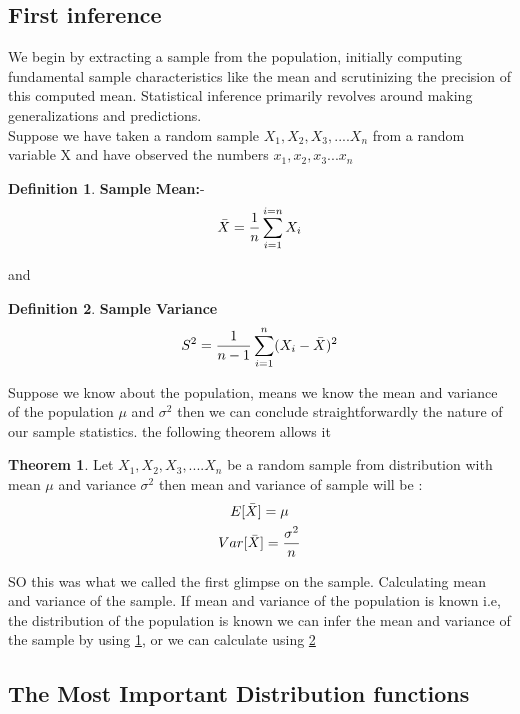 \documentclass[12pt,a4paper]{article}
\theoremstyle{example}
\theoremstyle{definition}
\newtheorem{definition}{Definition}
\theoremstyle{theorem}
\newtheorem{theorem}{Theorem}
\begin{document}
\subsection{First inference}
We begin by extracting a sample from the population, initially computing fundamental sample characteristics like the mean and scrutinizing the precision of this computed mean. Statistical inference primarily revolves around making generalizations and predictions. \\
Suppose we have taken a random sample $X_1,X_2,X_3,....X_n$ from a random variable
X and have observed the numbers $x_1,x_2,x_3...x_n$\\
\begin{definition}

\textbf{Sample Mean:}- \begin{equation}
    \Bar{X}=\frac{1}{n}\sum^{i=n}_{i=1}X_i
\end{equation}
    
\end{definition}
and 
\begin{definition}
    \textbf{Sample Variance}
    \begin{equation}
        S^{2}=\frac{1}{n-1}\sum^{n}_{i=1}(X_i-\Bar{X})^2
        \end{equation}
        \label{meandef}
\end{definition}
Suppose we know about the population, means we know the mean and variance of the population $\mu$ and $\sigma^2$ then we can conclude straightforwardly the nature of our sample statistics. the following theorem allows  it 
\begin{theorem}
    Let   $X_1,X_2,X_3,....X_n$ be a random sample from distribution with mean $\mu$ and variance $\sigma^2$ then mean and variance of sample will be :
    \begin{gather}
        E[\Bar{X}]=\mu\\
        Var[\Bar{X}]=\frac{\sigma^2}{n}
    \end{gather}
    \label{sample_mean}
\end{theorem}
SO this was what we called the first glimpse on the sample. Calculating mean and variance of the sample. If mean and variance of the population is known i.e, the distribution of the population is known we can infer the mean and variance of the sample by using \ref{sample_mean}, or we can calculate using  \ref{meandef}
\subsection{The Most Important Distribution functions }
\end{document}
